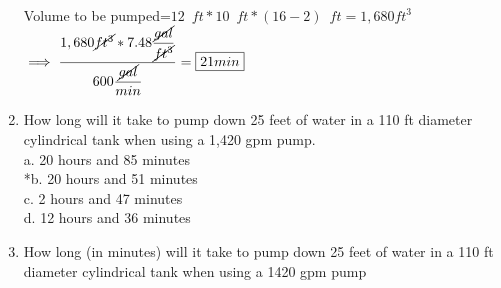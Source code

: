 \documentclass{article}
\begin{document}
\begin{enumerate}
\\
Volume to be pumped=$12 \enspace ft*10 \enspace ft *(16-2)\enspace ft=1,680ft^3$\\
\vspace{0.3cm}
$\implies \dfrac{1,680\cancel{ft^3}*7.48\dfrac{\cancel{gal}}{\cancel{ft^3}}}{600\dfrac{\cancel{gal}}{min}}=\boxed{21min}$


\item How long will it take to pump down 25 feet of water in a 110 ft diameter cylindrical tank when using a 1,420 gpm pump.\\ 

a. 20 hours and 85 minutes \\
*b. 20 hours and 51 minutes \\
c. 2 hours and 47 minutes \\
d. 12 hours and 36 minutes \\
\vspace{0.5cm}

\item How long (in minutes) will it take to pump down 25 feet of water in a 110 ft diameter cylindrical tank when using a 1420 gpm pump\\


\end{enumerate}
\end{document}
